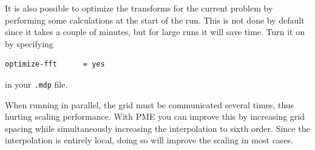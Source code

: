 It is also possible to optimize the transforms for the current problem
by performing some calculations at the start of the run. This is not
done by default since it takes a couple of minutes, but for large
runs it will save time. Turn it on by specifying

\begin{verbatim}
optimize-fft      = yes
\end{verbatim}
in your {\tt .mdp} file.

When running in parallel, the grid must be communicated several times,
thus hurting scaling performance. With PME you can improve this
by increasing grid spacing while simultaneously increasing the
interpolation to {\eg} sixth order. 
Since the interpolation is entirely local, doing so will
improve the scaling in most cases.

%
%
%



